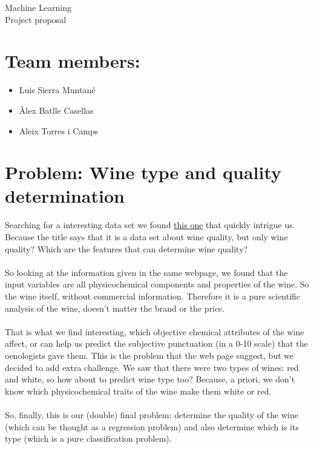 \documentclass[10pt]{article}
\begin{document}
\begingroup
  \centering
  \Huge Machine Learning \\
  \vskip 0.5cm
  \LARGE Project proposal\\[1.5em]
\endgroup

\section{Team members:}
\begin{itemize}
  \item Luis Sierra Muntané
  \item Àlex Batlle Casellas
  \item Aleix Torres i Camps
\end{itemize}
\vskip 0.3cm

\section{Problem: \color{violet} Wine type and quality determination}

Searching for a interesting data set we found \href{http://archive.ics.uci.edu/ml/datasets/Wine+Quality}{this one} that quickly intrigue us. Because the title says that it is a data set about wine quality, but only wine quality? Which are the features that can determine wine quality?
\\ \ \\
So looking at the information given in the same webpage, we found that the input variables are all physicochemical components and properties of the wine. So the wine itself, without commercial information. Therefore it is a pure scientific analysis of the wine, doesn't matter the brand or the price.
\\ \ \\
That is what we find interesting, which objective chemical attributes of the wine affect, or can help us predict the subjective punctuation (in a 0-10 scale) that the oenologists gave them. This is the problem that the web page suggest, but we decided to add extra challenge. We saw that there were two types of wines: red and white, so how about to predict wine type too? Because, a priori, we don't know which physicochemical traits of the wine make them white or red.
\\ \ \\
So, finally, this is our (double) final problem: determine the quality of the wine (which can be thought as a regression problem) and also determine which is its type (which is a pure classification problem).
\\ 
\end{document}

